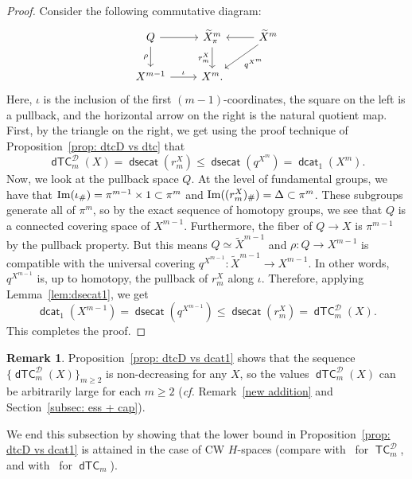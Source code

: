 \documentclass[amscd,amssymb,verbatim,11pt]{amsart}
\theoremstyle{plain}
\theoremstyle{definition}
\newtheorem{remark}[thm]{Remark}
\newcommand{\Wi}{\widetilde}
\DeclareMathOperator{\TC}{{\mathsf{TC}}}
\DeclareMathOperator{\dsecat}{{\mathsf{dsecat}}}
\DeclareMathOperator{\dcat}{{\mathsf{dcat}}}
\DeclareMathOperator{\dTC}{{\mathsf{dTC}}}
\newcommand{\D}{\mathcal{D}}
\def\Im{\protect\operatorname{Im}}
\begin{document}
\begin{proof}
    Consider the following commutative diagram:
    \[
    \begin{tikzcd}
        Q \arrow{r} \arrow{d}[swap]{\rho}
        &
        \Wi{X}^m_\pi \arrow{d}[swap]{r_m^X}
        &
        \Wi{X}^m \arrow{l} \arrow{dl}{q^{X^m}}
        \\
        X^{m-1} \arrow{r}{\iota} 
        & 
        X^m.
        &
    \end{tikzcd}
    \]
    Here, $\iota$ is the inclusion of the first $(m-1)$-coordinates, the square on the left is a pullback, and the horizontal arrow on the right is the natural quotient map. First, by the triangle on the right, we get using the proof technique of Proposition~\ref{prop: dtcD vs dtc} that
    \[
    \dTC_m^{\D}(X)=\dsecat(r_m^X)\le \dsecat(q^{X^m})=\dcat_1(X^m).
    \]
    Now, we look at the pullback space $Q$. At the level of fundamental groups, we have that $\Im(\iota_{\#})=\pi^{m-1}\times 1\subset \pi^m$ and $\Im((r_m^X)_{\#})=\Delta\subset \pi^m$. These subgroups generate all of $\pi^m$, so by the exact sequence of homotopy groups, we see that $Q$ is a connected covering space of $X^{m-1}$. Furthermore, the fiber of $Q \to X$ is $\pi^{m-1}$ by the pullback property. But this means $Q \simeq \Wi{X}^{m-1}$ and $\rho\colon Q \to X^{m-1}$ is compatible with the universal covering $q^{X^{m-1}}\colon \Wi{X}^{m-1} \to X^{m-1}$. In other words, $q^{X^{m-1}}$ is, up to homotopy, the pullback of $r_m^X$ along $\iota$. Therefore, applying Lemma~\ref{lem:dsecat1}, we get
    \[
    \dcat_1(X^{m-1})=\dsecat(q^{X^{m-1}}) \le \dsecat(r_m^X)=\dTC_m^{\D}(X).
    \]
    This completes the proof.
\end{proof}

\begin{remark}
Proposition~\ref{prop: dtcD vs dcat1} shows that the sequence $\{\dTC^{\D}_m(X)\}_{m\ge 2}$ is non-decreasing for any $X$, so the values $\dTC^{\D}_m(X)$ can be arbitrarily large for each $m\ge 2$ (\emph{cf.} Remark~\ref{new addition} and Section~\ref{subsec: ess + cap}).
\end{remark}



We end this subsection by showing that the lower bound in Proposition~\ref{prop: dtcD vs dcat1} is attained in the case of CW $H$-spaces (compare with~\cite[Proposition 3.13]{PS} for $\TC^{\D}_m$, and with~\cite[Theorem 6.3]{Ja1} for $\dTC_m$).
\end{document}
